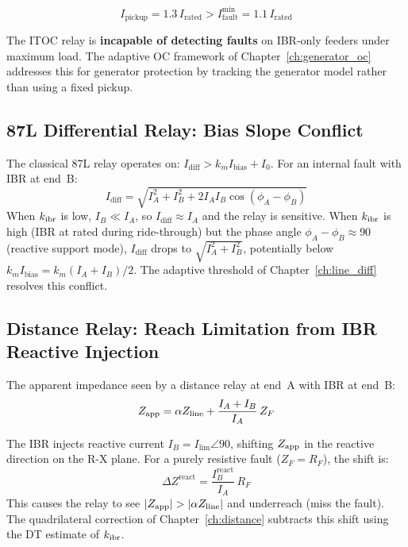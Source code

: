 \begin{equation}
  I_\mathrm{pickup} = 1.3\,I_\mathrm{rated} > I_\mathrm{fault}^\mathrm{min} = 1.1\,I_\mathrm{rated}
\end{equation}

The ITOC relay is \textbf{incapable of detecting faults} on IBR-only feeders
under maximum load. The adaptive OC framework of Chapter~\ref{ch:generator_oc}
addresses this for generator protection by tracking the generator model
rather than using a fixed pickup.

\subsection{87L Differential Relay: Bias Slope Conflict}

The classical 87L relay operates on:
$I_\mathrm{diff} > k_m I_\mathrm{bias} + I_0$.
For an internal fault with IBR at end~B:
\begin{equation}
  I_\mathrm{diff} = \sqrt{I_A^2 + I_B^2 + 2 I_A I_B \cos(\phi_A - \phi_B)}
\end{equation}
When $k_\mathrm{ibr}$ is low, $I_B \ll I_A$, so $I_\mathrm{diff} \approx I_A$ and the
relay is sensitive. When $k_\mathrm{ibr}$ is high (IBR at rated during ride-through)
but the phase angle $\phi_A - \phi_B \approx 90$ (reactive support mode),
$I_\mathrm{diff}$ drops to $\sqrt{I_A^2 + I_B^2}$, potentially below
$k_m I_\mathrm{bias} = k_m (I_A + I_B)/2$. The adaptive threshold of
Chapter~\ref{ch:line_diff} resolves this conflict.

\subsection{Distance Relay: Reach Limitation from IBR Reactive Injection}

The apparent impedance seen by a distance relay at end~A with IBR at end~B:
\begin{equation}
  Z_\mathrm{app} = \alpha Z_\mathrm{line} + \frac{I_A + I_B}{I_A}\, Z_F
  \label{eq:ch3_zapp}
\end{equation}

The IBR injects reactive current $I_B = I_\mathrm{lim}\angle 90$,
shifting $Z_\mathrm{app}$ in the reactive direction on the R-X plane. For a
purely resistive fault ($Z_F = R_F$), the shift is:
\begin{equation}
  \Delta Z^\mathrm{react} = \frac{I_B^\mathrm{react}}{I_A}\, R_F
  \label{eq:ch3_reach_shift}
\end{equation}
This causes the relay to see $|Z_\mathrm{app}| > |\alpha Z_\mathrm{line}|$ and underreach
(miss the fault). The quadrilateral correction of
Chapter~\ref{ch:distance} subtracts this shift using the DT estimate of $k_\mathrm{ibr}$.


